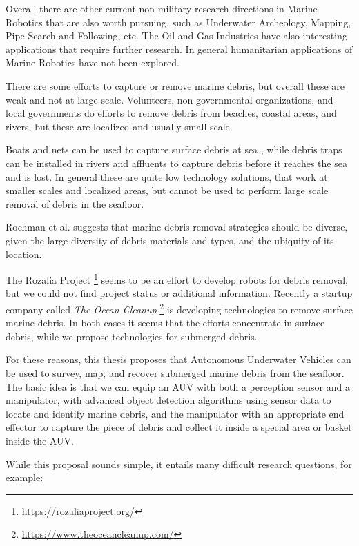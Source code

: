 Overall there are other current non-military research directions in Marine Robotics that are also worth pursuing, such as Underwater Archeology, Mapping, Pipe Search and Following, etc. The Oil and Gas Industries have also interesting applications that require further research. In general humanitarian applications of Marine Robotics have not been explored.

There are some efforts to capture or remove marine debris, but overall these are weak and not at large scale. Volunteers, non-governmental organizations, and local governments do efforts\cite[-10em]{nelms2017marine} to remove debris from beaches, coastal areas, and rivers, but these are localized and usually small scale.

Boats and nets can be used to capture surface debris at sea \cite[-5em]{kader2015design}, while debris traps can be installed in rivers and affluents to capture debris\cite[-1em]{beduhn1966removal} before it reaches the sea and is lost. In general these are quite low technology solutions, that work at smaller scales and localized areas, but cannot be used to perform large scale removal of debris in the seafloor.

Rochman et al. \cite[-1em]{rochman2016strategies} suggests that marine debris removal strategies should be diverse, given the large diversity of debris materials and types, and the ubiquity of its location.

The Rozalia Project \footnote{\url{https://rozaliaproject.org/}} seems to be an effort to develop robots for debris removal, but we could not find project status or additional information. Recently a startup company called \textit{The Ocean Cleanup} \footnote{\url{https://www.theoceancleanup.com/}} is developing technologies to remove surface marine debris. In both cases it seems that the efforts concentrate in surface debris, while we propose technologies for submerged debris.

For these reasons, this thesis proposes that Autonomous Underwater Vehicles can be used to survey, map, and recover submerged marine debris from the seafloor. The basic idea is that we can equip an AUV with both a perception sensor and a manipulator, with advanced object detection algorithms using sensor data to locate and identify marine debris, and the manipulator with an appropriate end effector to capture the piece of debris and collect it inside a special area or basket inside the AUV.

While this proposal sounds simple, it entails many difficult research questions, for example:

